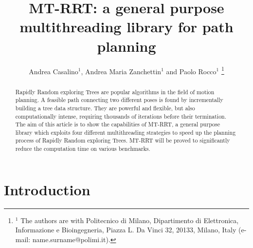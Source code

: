 \documentclass[letterpaper, 10 pt, conference]{ieeeconf}  %
\title{\LARGE \bf
MT-RRT: a general purpose multithreading library for path planning
}
\author{Andrea Casalino$^{1}$,  Andrea Maria Zanchettin$^{1}$ and Paolo Rocco$^{1}$%
\thanks{ $^{1}$ The authors are with Politecnico di Milano, Dipartimento di
Elettronica, Informazione e Bioingegneria, Piazza L. Da Vinci 32,
20133, Milano, Italy (e-mail: name.surname@polimi.it).}%
}
\begin{document}
\maketitle
\thispagestyle{empty}
\pagestyle{empty}


\begin{abstract}
Rapidly Random exploring Trees are popular algorithms in the field of motion planning.
A feasible path connecting two different poses is found by incrementally building a tree data structure. They are powerful and flexible, but also computationally intense, requiring thousands of iterations before their termination. 
The aim of this article is to show the capabilities of MT-RRT, a general purpose library which exploits four different multithreading strategies to speed up the planning process of Rapidly Random exploring Trees.
MT-RRT will be proved to significantly reduce the computation time on various benchmarks.
\end{abstract}


\section{Introduction}\label{sec:intro}
\end{document}

